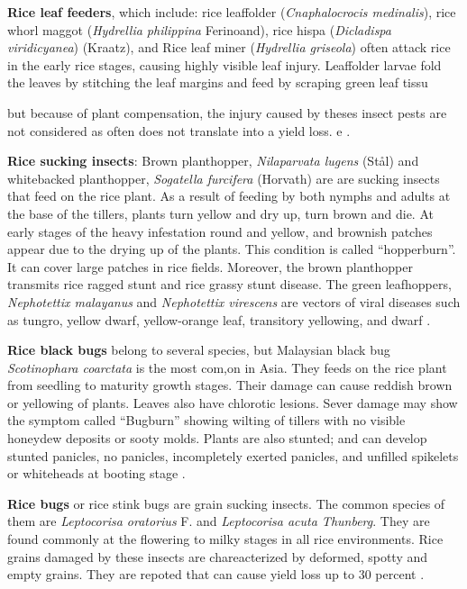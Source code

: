 \documentclass[12pt, oneside]{report}
\begin{document}
\textbf{Rice leaf feeders}, which include: rice leaffolder (\textit{Cnaphalocrocis medinalis}), rice whorl maggot (\textit{Hydrellia philippina} Ferinoand), rice hispa (\textit{Dicladispa viridicyanea}) (Kraatz), and Rice leaf miner (\textit{Hydrellia griseola}) often attack rice in the early rice stages, causing highly visible leaf injury. Leaffolder larvae fold the leaves by stitching the leaf margins and feed by scraping green leaf tissu

but because of plant compensation, the injury caused by theses insect pests are not considered as often does not translate into a yield loss. e \citep{irrirkb}. 

\textbf{Rice sucking insects}: Brown planthopper, \textit{Nilaparvata lugens} (St\aa l) and whitebacked planthopper, \textit{Sogatella furcifera} (Horvath) are are sucking insects that feed on the rice plant.  As a result of feeding by both nymphs and adults at the base of the tillers, plants turn yellow and dry up, turn brown and die. At early stages of the heavy infestation round and yellow, and brownish patches appear due to the drying up of the plants. This condition is called ``hopperburn''. It can cover large patches in rice fields. Moreover, the brown planthopper transmits rice ragged stunt and rice grassy stunt disease. The green leafhoppers, \textit{Nephotettix malayanus} and \textit{Nephotettix virescens} are vectors of viral diseases such as tungro, yellow dwarf, yellow-orange leaf, transitory yellowing, and dwarf \citep{irrirkb}.

\textbf{Rice black bugs} belong to several species, but Malaysian black bug \textit{Scotinophara coarctata} is the most com,on in Asia. They feeds on the rice plant from seedling to maturity growth stages. Their damage can cause reddish brown or yellowing of plants. Leaves also have chlorotic lesions. Sever damage may show the symptom called ``Bugburn'' showing wilting of tillers with no visible honeydew deposits or sooty molds. Plants are also stunted; and can develop stunted panicles, no panicles, incompletely exerted panicles, and unfilled spikelets or whiteheads at booting stage \citep{irrirkb}.

\textbf{Rice bugs} or rice stink bugs are grain sucking insects. The common species of them are \textit{Leptocorisa oratorius} F. and \textit{Leptocorisa acuta Thunberg}. They are found commonly at the flowering to milky stages in all rice environments. Rice grains damaged by these insects are chareacterized by deformed, spotty and empty grains. They are repoted that can cause yield loss up to 30 percent \citet{irrirkb}.
\end{document}
